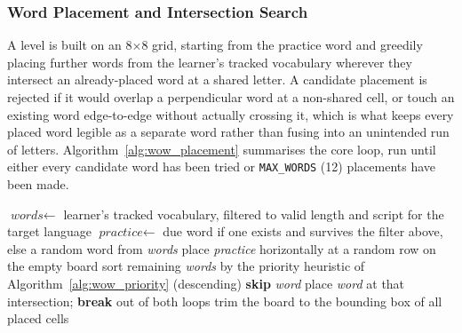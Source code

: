         \subsubsection{Word Placement and Intersection Search}
        A level is built on an 8$\times$8 grid, starting from the practice word and greedily placing further words from the learner's tracked vocabulary wherever they intersect an already-placed word at a shared letter. A candidate placement is rejected if it would overlap a perpendicular word at a non-shared cell, or touch an existing word edge-to-edge without actually crossing it, which is what keeps every placed word legible as a separate word rather than fusing into an unintended run of letters. Algorithm~\ref{alg:wow_placement} summarises the core loop, run until either every candidate word has been tried or \texttt{MAX\_WORDS} (12) placements have been made.

        \begin{algorithm}
        \caption{Word of Wonders board generation (per level)}
        \label{alg:wow_placement}
        \begin{algorithmic}[1]
        \STATE $\textit{words} \gets$ learner's tracked vocabulary, filtered to valid length and script for the target language
        \STATE $\textit{practice} \gets$ due word if one exists and survives the filter above, else a random word from \textit{words}
        \STATE place \textit{practice} horizontally at a random row on the empty board
        \STATE sort remaining \textit{words} by the priority heuristic of Algorithm~\ref{alg:wow_priority} (descending)
                \STATE \textbf{skip} \textit{word}
            \ENDIF
                        \STATE place \textit{word} at that intersection; \textbf{break} out of both loops
                    \ENDIF
                \ENDFOR
            \ENDFOR
        \ENDFOR
        \STATE trim the board to the bounding box of all placed cells
        \end{algorithmic}
        \end{algorithm}

